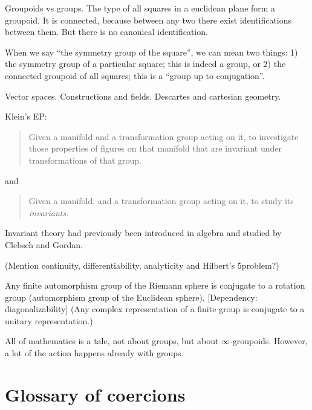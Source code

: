 Groupoids vs groups.
The type of all squares in a euclidean plane form a groupoid.
It is connected,
because between any two there exist identifications between them.
But there is no canonical identification.

When we say ``the symmetry group of the square'',
we can mean two things:
1) the symmetry group of a particular square;
this is indeed a group,
or 2) the connected groupoid of all squares;
this is a ``group up to conjugation''.

Vector spaces. Constructions and fields. Descartes and cartesian geometry.

Klein's EP:
\begin{quote}
  Given a manifold and a transformation group acting on it,
  to investigate those properties of figures on that manifold
  that are invariant under transformations of that group.
\end{quote}
and
\begin{quote}
  Given a manifold, and a transformation group acting on it,
  to study its \emph{invariants}.
\end{quote}
Invariant theory had previously been introduced in algebra
and studied by Clebsch and Gordan.

(Mention continuity, differentiability, analyticity and Hilbert's 5\th problem?)

Any finite automorphism group of the Riemann sphere is conjugate to a
rotation group (automorphism group of the Euclidean sphere).
[Dependency: diagonalizability] (Any complex representation of a
finite group is conjugate to a unitary representation.)


All of mathematics is a tale, not about groups,
but about $\infty$-groupoids.
However, a lot of the action happens already with groups.

\newpage

\section*{Glossary of coercions}

